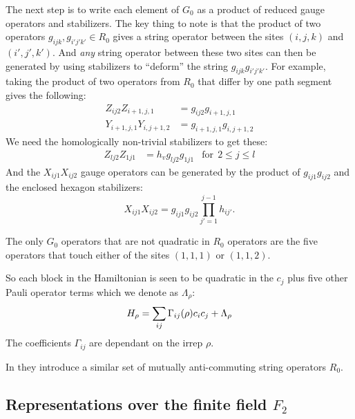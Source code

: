 \documentclass[12pt]{article}
\begin{document}
The next step is to write each element of $G_0$
as a product of reduced gauge operators and stabilizers.
The key thing to note is that the product of two
operators $g_{ijk}, g_{i'j'k'}\in R_0$ gives a string
operator between the sites $(i,j,k)$ and $(i',j',k')$.
And {\it any} string operator between these
two sites can then be generated by using stabilizers to
``deform'' the string $g_{ijk}g_{i'j'k'}.$
For example, taking the product
of two operators from $R_0$ that differ
by one path segment gives the following:
\begin{align*}
Z_{ij2}Z_{i+1,j,1} &= g_{ij2} g_{i+1,j,1} \\
Y_{i+1,j,1}Y_{i,j+1,2} &= g_{i+1,j,1}g_{i,j+1,2}
\end{align*}
We need the homologically non-trivial stabilizers to get these:
\begin{align*}
Z_{lj2}Z_{1j1} &= h_v g_{lj2} g_{1j1} &\mbox{for}\ \  2\le j\le l
\end{align*}
And the $X_{ij1}X_{ij2}$
gauge operators can be generated
by the product of 
$g_{ij1}g_{ij2}$ and the enclosed hexagon stabilizers:
$$X_{ij1}X_{ij2}=g_{ij1}g_{ij2}\prod_{j'=1}^{j-1} h_{ij'}.$$

The only $G_0$ operators that are not 
quadratic in $R_0$ operators are the five
operators that touch either of the sites
$(1,1,1)$ or $(1,1,2)$.

So each block in the Hamiltonian
is seen to be quadratic in the $c_j$ plus
five other Pauli operator terms which we denote as $\Lambda_\rho$:
$$
    H_\rho = \sum_{ij} \Gamma_{ij}(\rho) c_i c_j + \Lambda_\rho
$$
The coefficients $\Gamma_{ij}$ are dependant on the irrep $\rho.$

In \cite{Kells2009} they introduce a similar set of
mutually anti-commuting string operators $R_0.$


%

\subsection{Representations over the finite field $F_2$}
\end{document}
